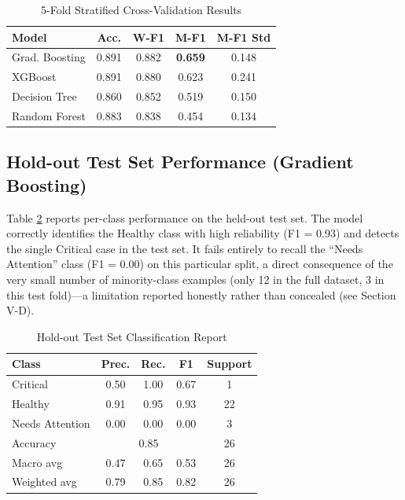 \documentclass[conference]{IEEEtran}
\begin{document}
\begin{table}[htbp]
\caption{5-Fold Stratified Cross-Validation Results}
\label{tab:cv}
\centering
\scriptsize
\begin{tabular}{lcccc}
\toprule
\textbf{Model} & \textbf{Acc.} & \textbf{W-F1} & \textbf{M-F1} & \textbf{M-F1 Std} \\
\midrule
Grad. Boosting & 0.891 & 0.882 & \textbf{0.659} & 0.148 \\
XGBoost & 0.891 & 0.880 & 0.623 & 0.241 \\
Decision Tree & 0.860 & 0.852 & 0.519 & 0.150 \\
Random Forest & 0.883 & 0.838 & 0.454 & 0.134 \\
\bottomrule
\end{tabular}
\end{table}

\subsection{Hold-out Test Set Performance (Gradient Boosting)}

Table \ref{tab:holdout} reports per-class performance on the held-out test set. The
model correctly identifies the Healthy class with high reliability (F1 = 0.93) and
detects the single Critical case in the test set. It fails entirely to recall the
``Needs Attention'' class (F1 = 0.00) on this particular split, a direct consequence of
the very small number of minority-class examples (only 12 in the full dataset, 3 in this
test fold)---a limitation reported honestly rather than concealed (see Section V-D).

\begin{table}[htbp]
\caption{Hold-out Test Set Classification Report}
\label{tab:holdout}
\centering
\scriptsize
\begin{tabular}{lcccc}
\toprule
\textbf{Class} & \textbf{Prec.} & \textbf{Rec.} & \textbf{F1} & \textbf{Support} \\
\midrule
Critical & 0.50 & 1.00 & 0.67 & 1 \\
Healthy & 0.91 & 0.95 & 0.93 & 22 \\
Needs Attention & 0.00 & 0.00 & 0.00 & 3 \\
\midrule
Accuracy & \multicolumn{3}{c}{0.85} & 26 \\
Macro avg & 0.47 & 0.65 & 0.53 & 26 \\
Weighted avg & 0.79 & 0.85 & 0.82 & 26 \\
\bottomrule
\end{tabular}
\end{table}
\end{document}
